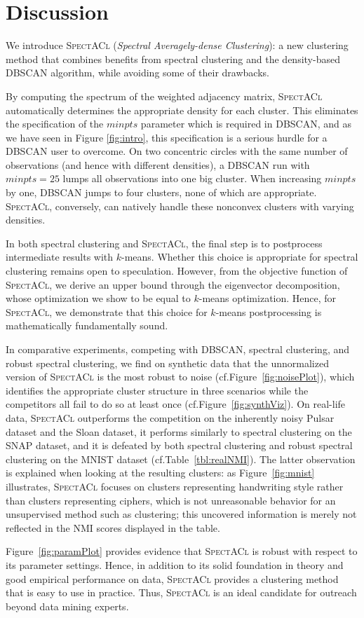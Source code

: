 \section{Discussion}
We introduce \textsc{SpectACl} (\emph{Spectral Averagely-dense Clustering}): a new clustering method that combines benefits from spectral clustering and the density-based DBSCAN algorithm, while avoiding some of their drawbacks. 

By computing the spectrum of the weighted adjacency matrix, \textsc{SpectACl} automatically determines the appropriate density for each cluster.  This eliminates the specification of the $minpts$ parameter which is required in DBSCAN, and as we have seen in Figure \ref{fig:intro}, this specification is a serious hurdle for a DBSCAN user to overcome. On two concentric circles with the same number of observations (and hence with different densities), a DBSCAN run with $minpts=25$ lumps all observations into one big cluster.  When increasing $minpts$ by one, DBSCAN jumps to four clusters, none of which are appropriate. \textsc{SpectACl}, conversely, can natively handle these nonconvex clusters with varying densities.

In both spectral clustering and \textsc{SpectACl}, the final step is to postprocess intermediate results with $k$-means. Whether this choice is appropriate for spectral clustering remains open to speculation.  However, from the objective function of \textsc{SpectACl}, we derive an upper bound through the eigenvector decomposition, whose optimization we show to be equal to $k$-means optimization.  Hence, for \textsc{SpectACl}, we demonstrate that this choice for $k$-means postprocessing is mathematically fundamentally sound.

In comparative experiments, competing with DBSCAN, spectral clustering, and robust spectral clustering, we find on synthetic data that the unnormalized version of \textsc{SpectACl} is the most robust to noise (cf.\@ Figure~\ref{fig:noisePlot}), which identifies the appropriate cluster structure in three scenarios while the competitors all fail to do so at least once (cf.\@ Figure~\ref{fig:synthViz}).  On real-life data, \textsc{SpectACl} outperforms the competition on the inherently noisy Pulsar dataset and the Sloan dataset, it performs similarly to spectral clustering on the SNAP dataset, and it is defeated by both spectral clustering and robust spectral clustering on the MNIST dataset (cf.\@ Table~\ref{tbl:realNMI}). The latter observation is explained when looking at the resulting clusters: as Figure~\ref{fig:mnist} illustrates, \textsc{SpectACl} focuses on clusters representing handwriting style rather than clusters representing ciphers, which is not unreasonable behavior for an unsupervised method such as clustering; this uncovered information is merely not reflected in the NMI scores displayed in the table.

Figure~\ref{fig:paramPlot} provides evidence that \textsc{SpectACl} is robust with respect to its parameter settings.  Hence, in addition to its solid foundation in theory and good empirical performance on data, \textsc{SpectACl} provides a clustering method that is easy to use in practice.  Thus, \textsc{SpectACl} is an ideal candidate for outreach beyond data mining experts.
